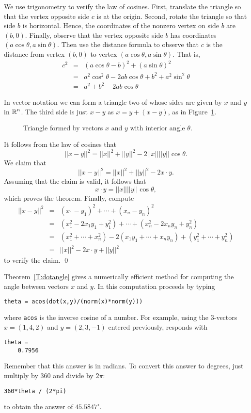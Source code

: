 \documentclass{ximera}
\begin{document}
We use trigonometry 
to verify the law of cosines.  First, translate the triangle so that  the vertex 
opposite side $c$ is at the origin.  Second, rotate the triangle so that side 
$b$ is horizontal.  Hence, the coordinates of the nonzero vertex on side 
$b$ are $(b,0)$.  Finally, observe that the vertex opposite side $b$ has 
coordinates $(a\cos\theta,a\sin\theta)$.  
Then use the distance formula to observe that $c$ is the distance
from vertex $(b,0)$ to vertex $(a\cos\theta,a\sin\theta)$.  That is,
\[
\begin{array}{rcl}
c^2 & = & (a\cos\theta - b)^2 + (a\sin\theta)^2\\
& = & a^2\cos^2\theta - 2ab\cos\theta + b^2 + a^2\sin^2\theta\\
& = & a^2 + b^2 - 2ab\cos\theta
\end{array}
\]


 \quad 
In vector notation we can form a triangle two of whose sides are
given by $x$ and $y$ in $\mbox{$\Bbb{R}$}^n$.  The third side is just $x-y$ as
$x=y+(x-y)$, as in Figure~\ref{F:costri}.

\begin{figure}[htb]
     \centerline{%
     }
     \caption{Triangle formed by vectors $x$ and $y$ with interior
	angle $\theta$.}
     \label{F:costri}
\end{figure}

It follows from the law of cosines that
\[
||x-y||^2 = ||x||^2 + ||y||^2 - 2||x|| ||y||  \cos\theta.
\]
We claim that
\[
||x-y||^2 = ||x||^2 + ||y||^2 -2x\cdot y.
\]
Assuming that the claim is valid, it follows that
\[
x\cdot y = ||x|| ||y||  \cos\theta,
\]
which proves the theorem.  Finally, compute
\begin{eqnarray*}
||x-y||^2 & = &(x_1-y_1)^2 + \cdots + (x_n-y_n)^2 \\
& = & (x_1^2-2x_1y_1+y_1^2) + \cdots + (x_n^2-2x_ny_n+y_n^2)\\
& = & (x_1^2+\cdots+x_n^2)-2(x_1y_1+\cdots+x_ny_n)+(y_1^2+\cdots+y_n^2)\\
& = & ||x||^2 -2x\cdot y + ||y||^2
\end{eqnarray*}
to verify the claim.   \qed

Theorem~\ref{T:dotangle} gives a numerically efficient method
for computing the angle between
vectors $x$ and $y$.  In \Matlab
this computation proceeds by typing
\begin{verbatim}
theta = acos(dot(x,y)/(norm(x)*norm(y)))
\end{verbatim} 
where {\tt acos} is the inverse cosine of a number.
For example, using the $3$-vectors $x = (1,4,2)$ and $y =
(2,3,-1)$ entered previously, \Matlab responds with
\begin{verbatim}
theta =
    0.7956
\end{verbatim}
Remember that this answer is in radians.  To convert
this answer to degrees, just multiply by $360$ and
divide by $2\pi$:
\begin{verbatim}
360*theta / (2*pi)
\end{verbatim}
to obtain the answer of $45.5847^\circ$.
\end{document}
